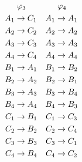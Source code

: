 \documentclass[
    hyperref={bookmarks=false},%
    xcolor={dvipsnames},
]{beamer}
\begin{document}
\begin{frame}
\begin{equation*}
\begin{aligned}[c]
    \end{aligned}
    \quad
    \begin{aligned}[c]
    &\hspace{1mm}\varphi_3 \\
    A_1 &\to C_1 \\A_2 &\to C_2 \\A_3 &\to C_3 \\A_4 &\to C_4 \\B_1 &\to A_1 \\B_2 &\to A_2 \\B_3 &\to A_3 \\B_4 &\to A_4 \\C_1 &\to B_1 \\C_2 &\to B_2 \\C_3 &\to B_3 \\C_4 &\to B_4
    \end{aligned}
    \quad
    \begin{aligned}[c]
    &\hspace{1mm}\varphi_4 \\
    A_1 &\to A_1 \\A_2 &\to A_2 \\A_3 &\to A_3 \\A_4 &\to A_4 \\B_1 &\to B_2 \\B_2 &\to B_1 \\B_3 &\to B_4 \\B_4 &\to B_3 \\C_1 &\to C_3 \\C_2 &\to C_4 \\C_3 &\to C_1 \\C_4 &\to C_2
    \end{aligned}
    \end{equation*}
\end{frame}
\end{document}
